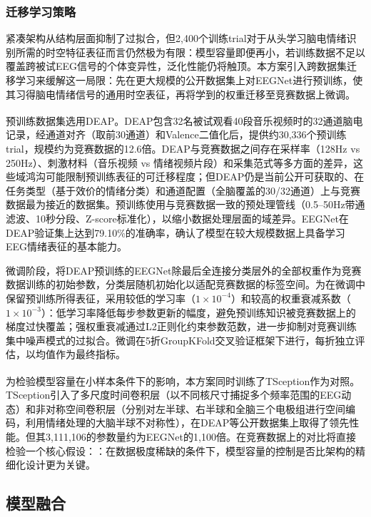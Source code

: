 \documentclass[UTF8,zihao=-4,fontset=windows]{ctexart}
\let\oldcite\cite
\renewcommand{\cite}[1]{\textsuperscript{\oldcite{#1}}}
\numberwithin{equation}{section}
\numberwithin{figure}{section}
\numberwithin{table}{section}
\begin{document}

\subsubsection{迁移学习策略}

紧凑架构从结构层面抑制了过拟合，但2,400个训练trial对于从头学习脑电情绪识别所需的时空特征表征而言仍然极为有限：模型容量即便再小，若训练数据不足以覆盖跨被试EEG信号的个体变异性，泛化性能仍将触顶。本方案引入跨数据集迁移学习来缓解这一局限：先在更大规模的公开数据集上对EEGNet进行预训练，使其习得脑电情绪信号的通用时空表征，再将学到的权重迁移至竞赛数据上微调。

预训练数据集选用DEAP\cite{deap}。DEAP包含32名被试观看40段音乐视频时的32通道脑电记录，经通道对齐（取前30通道）和Valence二值化后，提供约30,336个预训练trial，规模约为竞赛数据的12.6倍。DEAP与竞赛数据之间存在采样率（128Hz vs 250Hz）、刺激材料（音乐视频 vs 情绪视频片段）和采集范式等多方面的差异，这些域鸿沟可能限制预训练表征的可迁移程度；但DEAP仍是当前公开可获取的、在任务类型（基于效价的情绪分类）和通道配置（全脑覆盖的30/32通道）上与竞赛数据最为接近的数据集。预训练使用与竞赛数据一致的预处理管线（0.5--50Hz带通滤波、10秒分段、Z-score标准化），以缩小数据处理层面的域差异。EEGNet在DEAP验证集上达到79.10\%的准确率，确认了模型在较大规模数据上具备学习EEG情绪表征的基本能力。

微调阶段，将DEAP预训练的EEGNet除最后全连接分类层外的全部权重作为竞赛数据训练的初始参数，分类层随机初始化以适配竞赛数据的标签空间。为在微调中保留预训练所得表征，采用较低的学习率（$1\times10^{-4}$）和较高的权重衰减系数（$1\times10^{-3}$）：低学习率降低每步参数更新的幅度，避免预训练知识被竞赛数据上的梯度过快覆盖；强权重衰减通过L2正则化约束参数范数，进一步抑制对竞赛训练集中噪声模式的过拟合。微调在5折GroupKFold交叉验证框架下进行，每折独立评估，以均值作为最终指标。

为检验模型容量在小样本条件下的影响，本方案同时训练了TSception作为对照\cite{tsception}。TSception引入了多尺度时间卷积层（以不同核尺寸捕捉多个频率范围的EEG动态）和非对称空间卷积层（分别对左半球、右半球和全脑三个电极组进行空间编码，利用情绪处理的大脑半球不对称性），在DEAP等公开数据集上取得了领先性能。但其3,111,106的参数量约为EEGNet的1,100倍。在竞赛数据上的对比将直接检验一个核心假设：：在数据极度稀缺的条件下，模型容量的控制是否比架构的精细化设计更为关键。

\subsection{模型融合}
\end{document}
